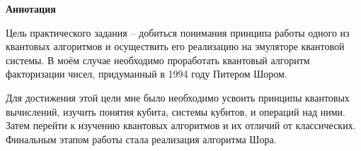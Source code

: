 \clearpage

\begin{center}
\textbf{Аннотация}
\end{center}

	Цель практического задания – добиться понимания принципа работы одного из квантовых алгоритмов и осуществить его реализацию на эмуляторе квантовой системы. В моём случае необходимо проработать квантовый алгоритм факторизации чисел, придуманный в 1994 году Питером Шором.
	
	Для достижения этой цели мне было необходимо усвоить принципы квантовых вычислений, изучить понятия кубита, системы кубитов, и операций над ними. Затем перейти к изучению квантовых алгоритмов и их отличий от классических. Финальным этапом работы стала реализация алгоритма Шора.




\newpage
